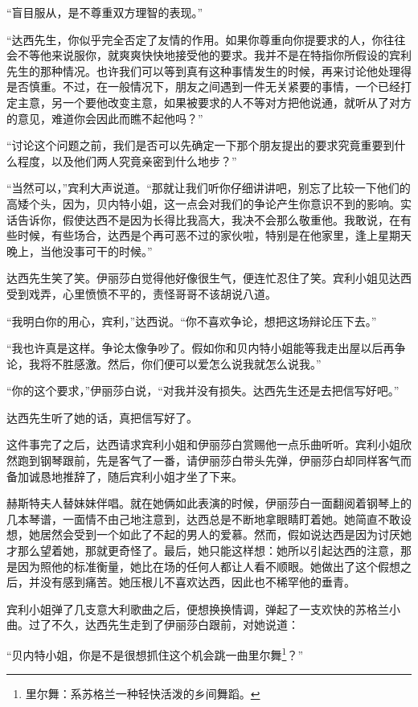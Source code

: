 \par “盲目服从，是不尊重双方理智的表现。”
\par “达西先生，你似乎完全否定了友情的作用。如果你尊重向你提要求的人，你往往会不等他来说服你，就爽爽快快地接受他的要求。我并不是在特指你所假设的宾利先生的那种情况。也许我们可以等到真有这种事情发生的时候，再来讨论他处理得是否慎重。不过，在一般情况下，朋友之间遇到一件无关紧要的事情，一个已经打定主意，另一个要他改变主意，如果被要求的人不等对方把他说通，就听从了对方的意见，难道你会因此而瞧不起他吗？”
\par “讨论这个问题之前，我们是否可以先确定一下那个朋友提出的要求究竟重要到什么程度，以及他们两人究竟亲密到什么地步？”
\par “当然可以，”宾利大声说道。“那就让我们听你仔细讲讲吧，别忘了比较一下他们的高矮个头，因为，贝内特小姐，这一点会对我们的争论产生你意识不到的影响。实话告诉你，假使达西不是因为长得比我高大，我决不会那么敬重他。我敢说，在有些时候，有些场合，达西是个再可恶不过的家伙啦，特别是在他家里，逢上星期天晚上，当他没事可干的时候。”
\par 达西先生笑了笑。伊丽莎白觉得他好像很生气，便连忙忍住了笑。宾利小姐见达西受到戏弄，心里愤愤不平的，责怪哥哥不该胡说八道。
\par “我明白你的用心，宾利，”达西说。“你不喜欢争论，想把这场辩论压下去。”
\par “我也许真是这样。争论太像争吵了。假如你和贝内特小姐能等我走出屋以后再争论，我将不胜感激。然后，你们便可以爱怎么说我就怎么说我。”
\par “你的这个要求，”伊丽莎白说，“对我并没有损失。达西先生还是去把信写好吧。”
\par 达西先生听了她的话，真把信写好了。
\par 这件事完了之后，达西请求宾利小姐和伊丽莎白赏赐他一点乐曲听听。宾利小姐欣然跑到钢琴跟前，先是客气了一番，请伊丽莎白带头先弹，伊丽莎白却同样客气而备加诚恳地推辞了，随后宾利小姐才坐了下来。
\par 赫斯特夫人替妹妹伴唱。就在她俩如此表演的时候，伊丽莎白一面翻阅着钢琴上的几本琴谱，一面情不由己地注意到，达西总是不断地拿眼睛盯着她。她简直不敢设想，她居然会受到一个如此了不起的男人的爱慕。然而，假如说达西是因为讨厌她才那么望着她，那就更奇怪了。最后，她只能这样想：她所以引起达西的注意，那是因为照他的标准衡量，她比在场的任何人都让人看不顺眼。她做出了这个假想之后，并没有感到痛苦。她压根儿不喜欢达西，因此也不稀罕他的垂青。
\par 宾利小姐弹了几支意大利歌曲之后，便想换换情调，弹起了一支欢快的苏格兰小曲。过了不久，达西先生走到了伊丽莎白跟前，对她说道：
\par “贝内特小姐，你是不是很想抓住这个机会跳一曲里尔舞\footnote{里尔舞：系苏格兰一种轻快活泼的乡间舞蹈。}？”
